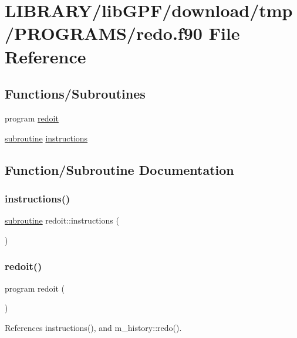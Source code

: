 \hypertarget{redo_8f90}{}\section{L\+I\+B\+R\+A\+R\+Y/lib\+G\+P\+F/download/tmp/\+P\+R\+O\+G\+R\+A\+M\+S/redo.f90 File Reference}
\label{redo_8f90}
\subsection*{Functions/\+Subroutines}
\begin{DoxyCompactItemize}
\item 
program \hyperlink{redo_8f90_a4f300f7db1b9163c705b941bcd47d4f9}{redoit}
\item 
\hyperlink{M__stopwatch_83_8txt_acfbcff50169d691ff02d4a123ed70482}{subroutine} \hyperlink{redo_8f90_af1f8c3c3b3f7a4bca478ea67f2fefc09}{instructions}
\end{DoxyCompactItemize}


\subsection{Function/\+Subroutine Documentation}
\mbox{\label{redo_8f90_af1f8c3c3b3f7a4bca478ea67f2fefc09}} 
\subsubsection{\texorpdfstring{instructions()}{instructions()}}
{\footnotesize\ttfamily \hyperlink{M__stopwatch_83_8txt_acfbcff50169d691ff02d4a123ed70482}{subroutine} redoit\+::instructions (\begin{DoxyParamCaption}{ }\end{DoxyParamCaption})}

\mbox{\label{redo_8f90_a4f300f7db1b9163c705b941bcd47d4f9}} 
\subsubsection{\texorpdfstring{redoit()}{redoit()}}
{\footnotesize\ttfamily program redoit (\begin{DoxyParamCaption}{ }\end{DoxyParamCaption})}



References instructions(), and m\+\_\+history\+::redo().

